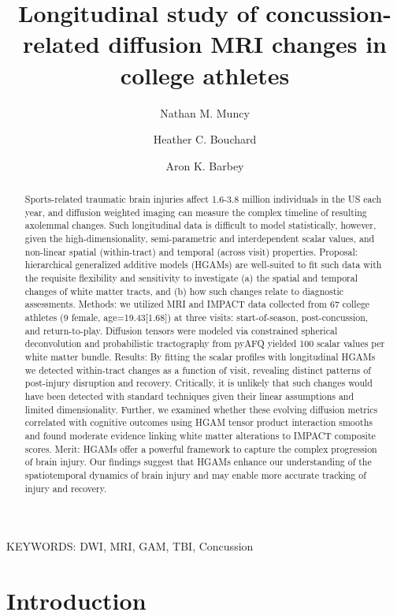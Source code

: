 \documentclass[12pt]{article}
\title{Longitudinal study of concussion-related diffusion MRI changes in college athletes}
\date{}
\author[1,*]{Nathan M. Muncy}
\author[1]{Heather C. Bouchard}
\author[1]{Aron K. Barbey}
\affil[1]{Center for Brain, Behavior and Biology, University of Nebraska-Lincoln, Lincoln, Nebraska, USA}
\affil[*]{Corresponding author.	Email: nmuncy2@unl.edu}
\begin{document}
\maketitle
\pagebreak


\begin{abstract}


Sports-related traumatic brain injuries affect 1.6-3.8 million individuals in the US each year, and diffusion weighted imaging can measure the complex timeline of resulting axolemmal changes. Such longitudinal data is difficult to model statistically, however, given the high-dimensionality, semi-parametric and interdependent scalar values, and non-linear spatial (within-tract) and temporal (across visit) properties. Proposal: hierarchical generalized additive models (HGAMs) are well-suited to fit such data with the requisite flexibility and sensitivity to investigate (a) the spatial and temporal changes of white matter tracts, and (b) how such changes relate to diagnostic assessments. Methods: we utilized MRI and IMPACT data collected from 67 college athletes (9 female, age=19.43[1.68]) at three visits: start-of-season, post-concussion, and return-to-play. Diffusion tensors were modeled via constrained spherical deconvolution and probabilistic tractography from pyAFQ yielded 100 scalar values per white matter bundle. Results: By fitting the scalar profiles with longitudinal HGAMs we detected within-tract changes as a function of visit, revealing distinct patterns of post-injury disruption and recovery. Critically, it is unlikely that such changes would have been detected with standard techniques given their linear assumptions and limited dimensionality. Further, we examined whether these evolving diffusion metrics correlated with cognitive outcomes using HGAM tensor product interaction smooths and found moderate evidence linking white matter alterations to IMPACT composite scores. Merit: HGAMs offer a powerful framework to capture the complex progression of brain injury. Our findings suggest that HGAMs enhance our understanding of the spatiotemporal dynamics of brain injury and may enable more accurate tracking of injury and recovery.

\end{abstract}

\vfill
KEYWORDS: DWI, MRI, GAM, TBI, Concussion\\
\pagebreak


\section{Introduction}
\label{sec:intro}
\end{document}

